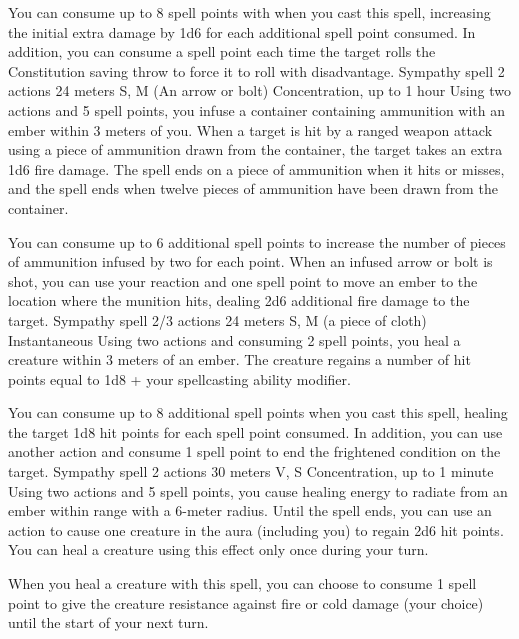         You can consume up to 8 spell points with when you cast this spell, increasing the initial extra damage by 1d6 for each additional spell point consumed.
        In addition, you can consume a spell point each time the target rolls the Constitution saving throw to force it to roll with disadvantage.
        {Sympathy spell}
        {2 actions}
        {24 meters}
        {S, M (An arrow or bolt)}
        {Concentration, up to 1 hour}
        Using two actions and 5 spell points, you infuse a container containing ammunition with an ember within 3 meters of you.
        When a target is hit by a ranged weapon attack using a piece of ammunition drawn from the container, the target takes an extra 1d6 fire damage.
        The spell ends on a piece of ammunition when it hits or misses, and the spell ends when twelve pieces of ammunition have been drawn from the container.

        You can consume up to 6 additional spell points to increase the number of pieces of ammunition infused by two for each point.
        When an infused arrow or bolt is shot, you can use your reaction and one spell point to move an ember to the location where the munition hits, dealing 2d6 additional fire damage to the target.
        {Sympathy spell}
        {2/3 actions}
        {24 meters}
        {S, M (a piece of cloth)}
        {Instantaneous}
        Using two actions and consuming 2 spell points, you heal a creature within 3 meters of an ember.
        The creature regains a number of hit points equal to 1d8 + your spellcasting ability modifier.

        You can consume up to 8 additional spell points when you cast this spell, healing the target 1d8 hit points for each spell point consumed.
        In addition, you can use another action and consume 1 spell point to end the frightened condition on the target.
        {Sympathy spell}
        {2 actions}
        {30 meters}
        {V, S}
        {Concentration, up to 1 minute}
        Using two actions and 5 spell points, you cause healing energy to radiate from an ember within range with a 6-meter radius.
        Until the spell ends, you can use an action to cause one creature in the aura (including you) to regain 2d6 hit points.
        You can heal a creature using this effect only once during your turn.

        When you heal a creature with this spell, you can choose to consume 1 spell point to give the creature resistance against fire or cold damage (your choice) until the start of your next turn.
